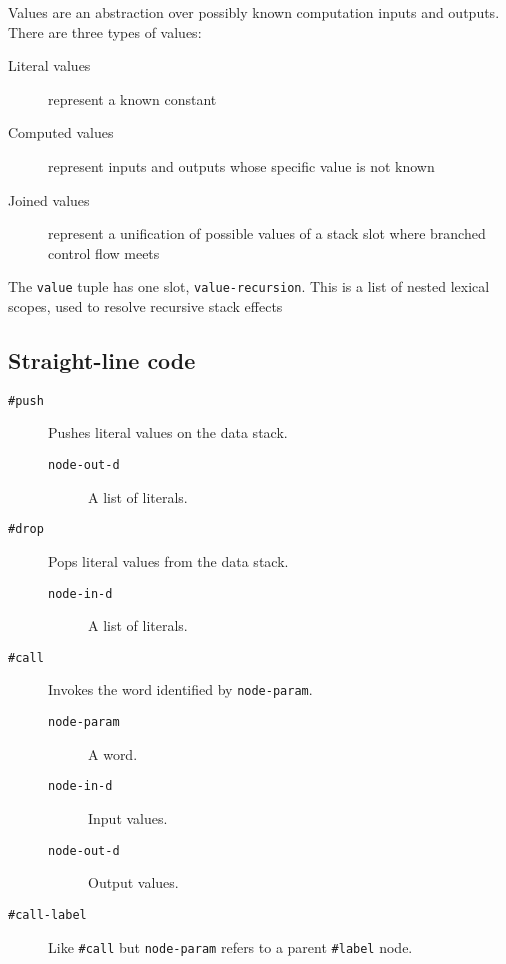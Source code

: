 \documentclass{book}
\begin{document}
Values are an abstraction over possibly known computation inputs and outputs. There are three types of values:

\begin{description}
\item[Literal values] represent a known constant
\item[Computed values] represent inputs and outputs whose specific value is not known
\item[Joined values] represent a unification of possible values of a stack slot where branched control flow meets
\end{description}

The \verb|value| tuple has one slot, \verb|value-recursion|. This is a list of nested lexical scopes, used to resolve recursive stack effects

\subsection{Straight-line code}

\begin{description}

\item[\texttt{\#push}] Pushes literal values on the data stack.

\begin{description}
\item[\texttt{node-out-d}] A list of literals.
\end{description}

\item[\texttt{\#drop}] Pops literal values from the data stack.

\begin{description}
\item[\texttt{node-in-d}] A list of literals.
\end{description}

\item[\texttt{\#call}] Invokes the word identified by \verb|node-param|.

\begin{description}
\item[\texttt{node-param}]A word.\\
\item[\texttt{node-in-d}]Input values.\\
\item[\texttt{node-out-d}]Output values.
\end{description}

\item[\texttt{\#call-label}] Like \verb|#call| but \verb|node-param| refers to a parent \verb|#label| node.

\end{description}
\end{document}
